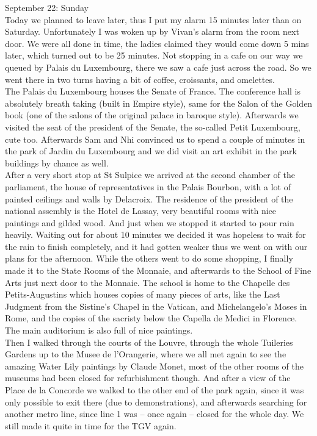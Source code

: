September 22: Sunday\\
Today we planned to leave later, thus I put my alarm 15 minutes later than on Saturday. Unfortunately I was woken up by Vivan's alarm from the room next door. We were all done in time, the ladies claimed they would come down 5 mins later, which turned out to be 25 minutes. Not stopping in a cafe on our way we queued by Palais du Luxembourg, there we saw a cafe just across the road. So we went there in two turns having a bit of coffee, croissants, and omelettes. \\
The Palais du Luxembourg houses the Senate of France. The conference hall is absolutely breath taking (built in Empire style), same for the Salon of the Golden book (one of the salons of the original palace in baroque style). Afterwards we visited the seat of the president of the Senate, the so-called Petit Luxembourg, cute too. Afterwards Sam and Nhi convinced us to spend a couple of minutes in the park of Jardin du Luxembourg and we did visit an art exhibit in the park buildings by chance as well.\\
 After a very short stop at St Sulpice we arrived at the second chamber of the parliament, the house of representatives in the Palais Bourbon, with a lot of painted ceilings and walls by Delacroix. The residence of the president of the national assembly is the Hotel de Lassay, very beautiful rooms with nice paintings and gilded wood. And just when we stopped it started to pour rain heavily. Waiting out for about 10 minutes we decided it was hopeless to wait for the rain to finish completely, and it had gotten weaker thus we went on with our plans for the afternoon. While the others went to do some shopping, I finally made it to the State Rooms of the Monnaie, and afterwards to the School of Fine Arts just next door to the Monnaie. The school is home to the Chapelle des Petits-Augustins which houses copies of many pieces of arts, like the Last Judgment from the Sistine's Chapel in the Vatican, and Michelangelo's Moses in Rome, and the copies of the sacristy below the Capella de Medici in Florence. The main auditorium is also full of nice paintings.\\
 Then I walked through the courts of the Louvre, through the whole Tuileries Gardens up to the Musee de l'Orangerie, where we all met again to see the amazing Water Lily paintings by Claude Monet, most of the other rooms of the museums had been closed for refurbishment though. And after a view of the Place de la Concorde we walked to the other end of the park again, since it was only possible to exit there (due to demonstrations), and afterwards searching for another metro line, since line 1 was -- once again -- closed for the whole day. We still made it quite in time for the TGV again.\\

